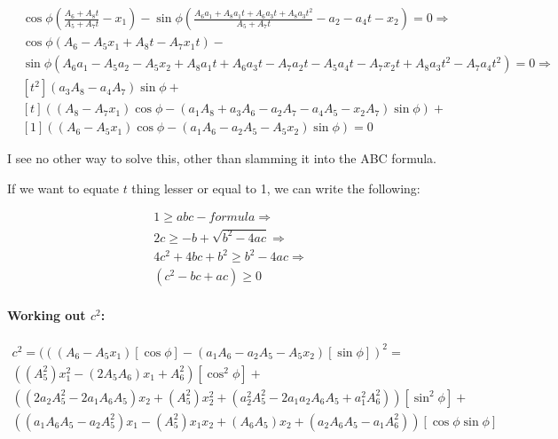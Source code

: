 \documentclass{article}
\begin{document}
\begin{align*}
    &\cos \phi \left(\frac{ A_6 + A_8 t}
      { A_5  + A_7 t } - x_1 \right) - \sin \phi \left(\frac{ A_6 a_1 + A_8 a_1 t + A_6 a_3 t + A_8 a_3 t^2 }{A_5 + A_7t} - a_2 - a_4 t - x_2 \right) = 0 \Rightarrow \\
     &\cos \phi (A_6 - A_5x_1 + A_8t - A_7 x_1 t ) - \\
      &\sin \phi (A_6 a_1 - A_5a_2 - A_5x_2 + A_8 a_1  t +   A_6 a_3 t  - A_7a_2 t - A_5a_4 t- A_7x_2 t+ A_8 a_3 t^2  -A_7a_4 t^2 ) = 0 \Rightarrow \\
      &[t^2] (a_3A_8 -a_4A_7 )\sin \phi + \\
      &[t] ( (A_8 -  A_7 x_1) \cos \phi - 
      (a_1A_8  +   a_3A_6   - a_2A_7 - a_4A_5- x_2A_7) \sin \phi) +\\
      &[1] (  (A_6 -  A_5 x_1) \cos \phi -
      (a_1A_6  - a_2A_5 - A_5x_2) \sin \phi ) = 0
\end{align*}

I see no other way to solve this, other than slamming it into the ABC formula.




If we want to equate $t$ thing lesser or equal to 1, we can write the following:

\begin{align*}
     1 \ge abc-formula \Rightarrow \\
    2c \ge -b + \sqrt{b^2 - 4 ac} \Rightarrow \\
    4c^2 + 4bc + b^2 \ge b^2 - 4 ac \Rightarrow \\
    (c^2 - bc + ac) \ge 0 
\end{align*}

\paragraph*{Working out $c^2$:}

\begin{align*}
    c^2 = (  (  (A_6 -  A_5 x_1) [\cos \phi] -
      (a_1A_6  - a_2A_5 - A_5x_2) [\sin \phi] )^2 = \\
          ((A_5^2) x_1^2 - (2 A_5 A_6) x_1  + A_6^2)[\cos^2 \phi] +\\
    ( (2 a_2 A_5^2 - 2 a_1 A_6 A_5) x_2 + (A_5^2) x_2^2 
    +  (a_2^2 A_5^2 - 2 a_1 a_2 A_6 A_5 + a_1^2 A_6^2)    ) [\sin^2 \phi] + \\
    ((a_1 A_6 A_5 -a_2 A_5^2 ) x_1 - (A_5^2) x_1 x_2 + (A_6 A_5) x_2 + (a_2 A_6 A_5 - a_1 A_6^2) ) [\cos \phi \sin \phi]
\end{align*}
\end{document}
